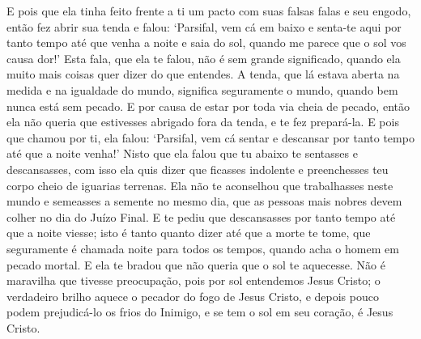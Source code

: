 E pois que ela tinha feito frente a ti um pacto com suas falsas falas e seu
engodo, então fez abrir sua tenda e falou: ‘Parsifal, vem cá em baixo e
senta-te aqui por tanto tempo até que venha a noite e saia do sol, quando me
parece que o sol vos causa dor!’ Esta fala, que ela te falou, não é sem grande
significado, quando ela muito mais coisas quer dizer do que entendes. A tenda,
que lá estava aberta na medida e na igualdade do mundo, significa seguramente o
mundo, quando bem nunca está sem pecado. E por causa de estar por toda via
cheia de pecado, então ela não queria que estivesses abrigado fora da tenda, e
te fez prepará-la. E pois que chamou por ti, ela falou: ‘Parsifal, vem cá
sentar e descansar por tanto tempo até que a noite venha!’ Nisto que ela
falou que tu abaixo te sentasses e descansasses, com isso ela quis dizer que
ficasses indolente e preenchesses teu corpo cheio de iguarias terrenas. Ela não
te aconselhou que trabalhasses neste mundo e semeasses a semente no mesmo dia,
que as pessoas mais nobres devem colher no dia do Juízo Final. E te pediu que
descansasses por tanto tempo até que a noite viesse; isto é tanto quanto dizer
até que a morte te tome, que seguramente é chamada noite para todos os tempos,
quando acha o homem em pecado mortal. E ela te bradou que não queria que o sol
te aquecesse. Não é maravilha que tivesse preocupação, pois por sol entendemos
Jesus Cristo; o verdadeiro brilho aquece o pecador do fogo de Jesus Cristo, e
depois pouco podem prejudicá-lo os frios do Inimigo, e se tem o sol em seu
coração, é Jesus Cristo.  

